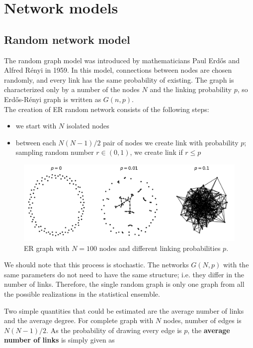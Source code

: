 \section{Network models}

\subsection{Random network model}

The random graph model was introduced by mathematicians Paul Erdős and Alfred R\' {e}nyi in 1959. In this model, connections between nodes are chosen randomly, and every link has the same probability of existing. The graph is characterized only by a number of the nodes $N$ and the linking probability $p$, so Erdős-R\' {e}nyi graph is written as $G(n, p)$. \\

The creation of ER random network consists of the following steps:
\begin{itemize}
	\item we start with $N$ isolated nodes
	\item between each $N(N-1)/2$ pair of nodes we create link with probability $p$; sampling random number $r \in (0,1)$, we create link if $r \leq p$    
\end{itemize}


\begin{figure}[h!]
	\centering
	\includegraphics[width=0.9\linewidth]{figures/methodology/ERgraph}
	\caption{ER graph with $N=100$ nodes and different linking probabilities $p$.}
	\label{fig:erp}
\end{figure}

We should note that this process is stochastic. The networks $G(N, p)$ with the same parameters do not need to have the same structure; i.e. they differ in the number of links. Therefore, the single random graph is only one graph from all the possible realizations in the statistical ensemble. 

Two simple quantities that could be estimated are the average number of links and the average degree. For complete graph with $N$ nodes, number of edges is $N(N-1)/2$. As the probability of drawing every edge is $p$, the \textbf{average number of links} is simply given as 

